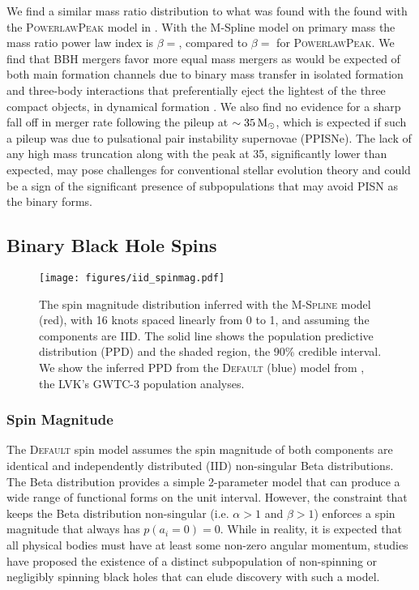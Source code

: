 We find a similar mass ratio distribution to what was found with the found with the \textsc{PowerlawPeak} model in \citet{o3b_astro_dist}. 
With the M-Spline model on primary mass the mass ratio power law index is $\beta = $\result{$\CIPlusMinus{\macros[MSplineIIDCompSpins][beta]}$}, 
compared to $\beta = $\result{$\CIPlusMinus{\macros[PLPeak][beta]}$} for \textsc{PowerlawPeak}. We find that BBH mergers favor more equal mass mergers
as would be expected of both main formation channels due to binary mass transfer in isolated formation and three-body interactions that preferentially eject
the lightest of the three compact objects, in dynamical formation . We also find no evidence for a sharp fall off in merger rate following 
the pileup at $\sim35\,{\rm M}_\odot$, which is expected if such a pileup was due to pulsational pair instability supernovae (PPISNe). The lack of any high mass truncation 
along with the peak at 35\msun, significantly lower than expected, may pose challenges for conventional stellar evolution theory and could be a sign of 
the significant presence of subpopulations that may avoid PISN as the binary forms. 

\subsection{Binary Black Hole Spins} \label{sec:spin_dist}

\begin{figure}
    \begin{centering}    
        \texttt{[image: figures/iid\_spinmag.pdf]}
        \caption{The spin magnitude distribution inferred with the \textsc{M-Spline} model (red), with 16 knots spaced linearly from 0 to 1, and 
        assuming the components are IID. The solid line shows the population predictive distribution (PPD) and the shaded region, the 90\% credible interval. 
        We show the inferred PPD from the \textsc{Default} (blue) model from \citet{o3b_astro_dist}, the LVK's GWTC-3 population analyses.}
        \label{fig:iid_spinmag_dist}
    \end{centering}
\end{figure}

\subsubsection{Spin Magnitude}

The \textsc{Default} spin model assumes the spin magnitude of both components are identical and independently distributed (IID) non-singular Beta distributions. The
Beta distribution provides a simple 2-parameter model that can produce a wide range of functional forms on the unit interval. However, the constraint that keeps 
the Beta distribution non-singular (i.e. $\alpha>1$ and $\beta>1$) enforces a spin magnitude that always has $p(a_i=0) = 0$. While in reality, it is expected that 
all physical bodies must have at least some non-zero angular momentum, studies have proposed the existence of a distinct subpopulation of non-spinning or 
negligibly spinning black holes that can elude discovery with such a model. 

